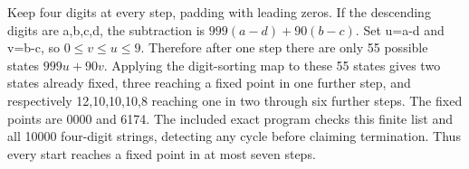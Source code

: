 Keep four digits at every step, padding with leading zeros. If the descending digits are a,b,c,d, the subtraction is $999(a-d)+90(b-c)$. Set u=a-d and v=b-c, so $0\le v\le u\le9$. Therefore after one step there are only 55 possible states $999u+90v$. Applying the digit-sorting map to these 55 states gives two states already fixed, three reaching a fixed point in one further step, and respectively 12,10,10,10,8 reaching one in two through six further steps. The fixed points are 0000 and 6174. The included exact program checks this finite list and all 10000 four-digit strings, detecting any cycle before claiming termination. Thus every start reaches a fixed point in at most seven steps.
